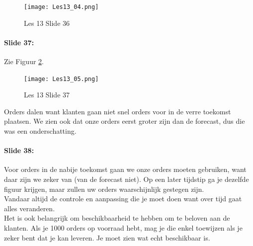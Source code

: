 \documentclass[10pt,a4paper]{report}
\begin{document}
\begin{figure}[h!]
\centering
\texttt{[image: Les13\_04.png]}
\caption{Les 13 Slide 36} 
\label{les13_04}
\end{figure}

\paragraph{Slide 37:} Zie Figuur \ref{les13_05}.\\

\begin{figure}[h!]
\centering
\texttt{[image: Les13\_05.png]}
\caption{Les 13 Slide 37} 
\label{les13_05}
\end{figure}

Orders dalen want klanten gaan niet snel orders voor in de verre toekomst plaatsen. We zien ook dat onze orders eerst groter zijn dan de forecast, dus die was een onderschatting.

\paragraph{Slide 38:} Voor orders in de nabije toekomst gaan we onze orders moeten gebruiken, want daar zijn we zeker van (van de forecast niet). Op een later tijdstip ga je dezelfde figuur krijgen, maar zullen uw orders waarschijnlijk gestegen zijn.\\
Vandaar altijd de controle en aanpassing die je moet doen want over tijd gaat alles veranderen.\\
Het is ook belangrijk om beschikbaarheid te hebben om te beloven aan de klanten. Als je 1000 orders op voorraad hebt, mag je die enkel toewijzen als je zeker bent dat je kan leveren. Je moet zien wat echt beschikbaar is.
\end{document}

